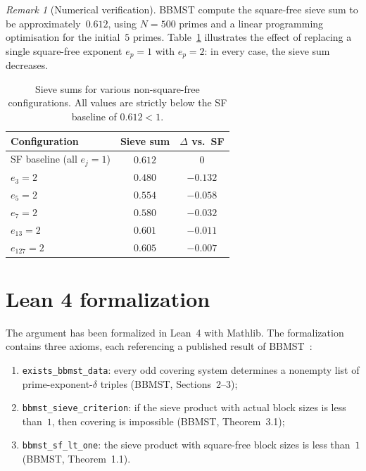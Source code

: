\documentclass[11pt]{amsart}
\theoremstyle{definition}
\theoremstyle{remark}
\newtheorem{remark}[theorem]{Remark}
\begin{document}
\begin{remark}[Numerical verification]
BBMST compute the square-free sieve sum to be approximately~$0.612$, using $N = 500$ primes
and a linear programming optimisation for the initial~$5$ primes.
Table~\ref{tab:numerical} illustrates the effect of replacing a single square-free
exponent $e_p = 1$ with $e_p = 2$: in every case, the sieve sum decreases.
\end{remark}

\begin{table}[h]
\centering
\begin{tabular}{@{}lcc@{}}
\toprule
Configuration & Sieve sum & $\Delta$ vs.\ SF \\
\midrule
SF baseline (all $e_j = 1$) & $0.612$ & $0$ \\
$e_3 = 2$ & $0.480$ & $-0.132$ \\
$e_5 = 2$ & $0.554$ & $-0.058$ \\
$e_7 = 2$ & $0.580$ & $-0.032$ \\
$e_{13} = 2$ & $0.601$ & $-0.011$ \\
$e_{127} = 2$ & $0.605$ & $-0.007$ \\
\bottomrule
\end{tabular}
\caption{Sieve sums for various non-square-free configurations.
All values are strictly below the SF baseline of $0.612 < 1$.}
\label{tab:numerical}
\end{table}

\section{Lean 4 formalization}

The argument has been formalized in Lean~4 with Mathlib.
The formalization contains three axioms, each referencing a published result of
BBMST~\cite{BBMST2019}:

\begin{enumerate}
\item \texttt{exists\_bbmst\_data}: every odd covering system determines a nonempty list
      of prime-exponent-$\delta$ triples (BBMST, Sections~2--3);
\item \texttt{bbmst\_sieve\_criterion}: if the sieve product with actual block sizes is
      less than~$1$, then covering is impossible (BBMST, Theorem~3.1);
\item \texttt{bbmst\_sf\_lt\_one}: the sieve product with square-free block sizes is less
      than~$1$ (BBMST, Theorem~1.1).
\end{enumerate}
\end{document}

